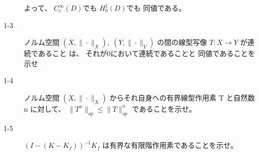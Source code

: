 \documentclass[12pt,b5paper]{ltjsarticle}
\begin{document}
\begin{description}
            よって、
            $C_{c}^{\infty}(D)$でも
            $H_{0}^{1}(D)$でも
            同値である。


            \hrulefill


 \item[1-3]
            ノルム空間
            $(X,\|\cdot\|_{X}),\;(Y,\|\cdot\|_{Y})$
            の間の線型写像
            $T:X\to Y$
            が連続であること
            は、
            それが0において連続であることと
            同値であることを示せ

            \dotfill


            \hrulefill

 \item[1-4]
            ノルム空間
            $(X,\|\cdot\|_{X})$
            からそれ自身への有界線型作用素 T と自然数 n に対して、
            $\|T^{n}\|_{op} \leq \|T\|_{op}^{n}$
            であることを示せ。


            \dotfill


            \hrulefill


 \item[1-5]
            $(I-(K-K_{f}))^{-1}K_{f}$
            は有界な有限階作用素であることを示せ。

            \dotfill


            \hrulefill


\end{description}

\hrulefill
\end{document}

